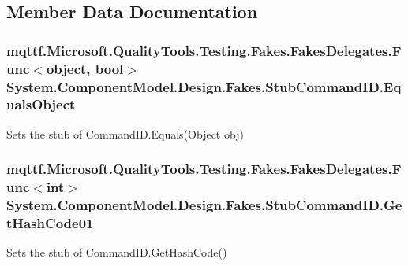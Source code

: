 \subsection{Member Data Documentation}
\hypertarget{class_system_1_1_component_model_1_1_design_1_1_fakes_1_1_stub_command_i_d_adcb47b2e251a41699d8585f92735d821}{
\subsubsection[{Equals\-Object}]{\setlength{\rightskip}{0pt plus 5cm}mqttf.\-Microsoft.\-Quality\-Tools.\-Testing.\-Fakes.\-Fakes\-Delegates.\-Func$<$object, bool$>$ System.\-Component\-Model.\-Design.\-Fakes.\-Stub\-Command\-I\-D.\-Equals\-Object}}\label{class_system_1_1_component_model_1_1_design_1_1_fakes_1_1_stub_command_i_d_adcb47b2e251a41699d8585f92735d821}


Sets the stub of Command\-I\-D.\-Equals(\-Object obj)

\hypertarget{class_system_1_1_component_model_1_1_design_1_1_fakes_1_1_stub_command_i_d_a522548449790c9fc499cefe64950fc7f}{
\subsubsection[{Get\-Hash\-Code01}]{\setlength{\rightskip}{0pt plus 5cm}mqttf.\-Microsoft.\-Quality\-Tools.\-Testing.\-Fakes.\-Fakes\-Delegates.\-Func$<$int$>$ System.\-Component\-Model.\-Design.\-Fakes.\-Stub\-Command\-I\-D.\-Get\-Hash\-Code01}}\label{class_system_1_1_component_model_1_1_design_1_1_fakes_1_1_stub_command_i_d_a522548449790c9fc499cefe64950fc7f}


Sets the stub of Command\-I\-D.\-Get\-Hash\-Code()

